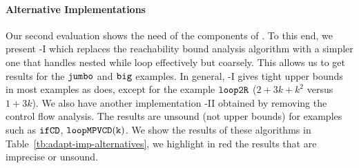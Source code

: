 
{\paragraph{Alternative Implementations}

 Our second evaluation shows the need of the 
components of {\THESYSTEM}. 
To this end, we present {\THESYSTEM}-I which replaces the reachability bound analysis algorithm 
with a simpler one that handles nested while loop effectively but coarsely. This allows us to get results for the $\mathtt{jumbo}$ and $\mathtt{big}$ examples.
In general, {\THESYSTEM}-I gives tight upper bounds in most examples as {\THESYSTEM} does, except for the example $\mathtt{loop2R}$ ($2+3k+k^2$ versus $1+3k$).
We also have another implementation {\THESYSTEM}-II obtained by removing the control flow analysis. The results are unsound (not upper bounds) for examples such as $\mathtt{ifCD}$, $ \mathtt{loopMPVCD(k)} $. 
We show the results of these algorithms in Table~\ref{tb:adapt-imp-alternatives}, we highlight in red the results that are imprecise or unsound.
}


